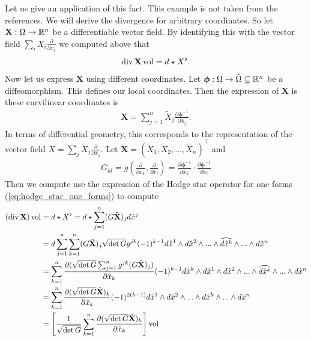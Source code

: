 \documentclass[../main.tex]{subfiles}
\begin{document}
Let us give an application of this fact. This example is not taken from the 
references. We will derive the divergence for arbitrary coordinates. 
So let $\mathbf{X}: \Omega \rightarrow \mathbb{R}^n$ be a differentiable vector field. By 
identifying this with the vector field $\sum_i X_i \frac{\partial}{\partial x_i}
$ we computed above that 
\begin{align*}
    \operatorname{div} \mathbf{X} \operatorname{vol} = d \star X^\flat.
\end{align*}
Now let us express $\mathbf{X}$ using different coordinates. 
Let $\bm{\phi}: \Omega \rightarrow \hat{\Omega} \subseteq \mathbb{R}^n$ be a diffeomorphism. 
This defines our local coordinates. Then the expression of $\mathbf{X}$ is
these curvilinear coordinates is
\begin{align*}
    \mathbf{X} = \sum_{j=1}^n \tilde{X}_j 
        \frac{\partial \bm{\phi}^{-1}}{\partial \hat{x}_j}.
\end{align*}
In terms of differential geometry, this corresponds to the representation of the vector field 
$X = \sum_j \tilde{X}_j \frac{\partial}{\partial \hat{x}_j}$. 
Let $\tilde{\mathbf{X}} = (\tilde{X}_1, \tilde{X}_2, ..., \tilde{X}_n)^\top$ 
and 
\begin{align*}
    G_{kl} = g(\frac{\partial}{\partial \hat{x}_k}, \frac{\partial}{\partial \hat{x}_l})
        = \frac{\partial \bm{\phi}^{-1}}{\partial \hat{x}_k} \cdot 
            \frac{\partial \bm{\phi}^{-1}}{\partial \hat{x}_l}
\end{align*}
Then we compute use the expression of the Hodge star operator 
for one forms (\ref{eq:hodge_star_one_forms}) to compute
\begin{align*}
    (\operatorname{div} \mathbf{X}) \operatorname{vol} 
    &= d \star X^\flat 
    = d \star \sum_{j=1}^n (G \tilde{\mathbf{X}})_j d\hat{x}^j 
    \\ &= d \sum_{j=1}^n \sum_{k=1}^n (G \tilde{\mathbf{X}})_j 
        \sqrt{ \det G} g^{jk} (-1)^{k-1} d\hat{x}^1 \wedge d\hat{x}^2 \wedge ... \wedge 
        \widehat{d\hat{x}^k} \wedge ... \wedge d\hat{x}^n 
    \\ &= \sum_{k=1}^n \frac{\partial
        (\sqrt{ \det G} \sum_{j=1}^n g^{jk} (G \tilde{\mathbf{X}})_j )}
        {\partial \hat{x}_k} (-1)^{k-1} d\hat{x}^k \wedge d\hat{x}^1 \wedge d\hat{x}^2 \wedge ... \wedge 
        \widehat{d\hat{x}^k} \wedge ... \wedge d\hat{x}^n 
    \\ &= \sum_{k=1}^n \frac{\partial (\sqrt{ \det G}  \tilde{\mathbf{X}})_k }
        {\partial \hat{x}_k} (-1)^{2(k-1)} d\hat{x}^1 \wedge d\hat{x}^2 \wedge ... \wedge 
        d\hat{x}^k \wedge ... \wedge d\hat{x}^n
    \\ &= \left[ \frac{1}{\sqrt{ \det G}} \sum_{k=1}^n 
        \frac{\partial (\sqrt{ \det G}  \tilde{\mathbf{X}})_k }{\partial \hat{x}_k}
        \right] \operatorname{vol}
\end{align*}
\end{document}
